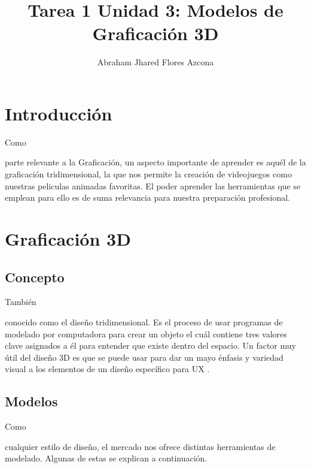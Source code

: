 \documentclass[stu, 12pt, letterpaper, donotrepeattitle, floatsintext, natbib]{apa7}
\title{\Large Tarea 1 Unidad 3: Modelos de Graficación 3D}
\author{Abraham Jhared Flores Azcona} %
\affiliation{Instituto Tecnológico de Tijuana}
\begin{document}
    \maketitle

    \renewcommand\contentsname{Contenido}
    \tableofcontents

    \newpage
    \section*{Introducción}
    Como \begin{justifying}
    parte relevante a la Graficación, un aspecto importante de aprender es aquél de la graficación tridimensional, la que nos permite la creación
    de videojuegos como nuestras peliculas animadas favoritas. El poder aprender las herramientas que se emplean para ello es de suma relevancia para nuestra preparación profesional.\par  
    \end{justifying}
    \vspace{\baselineskip}
    \section{Graficación 3D}
    \subsection{Concepto}
    También \begin{justifying}
        conocido como el diseño tridimensional. Es el proceso de usar programas de modelado por computadora para crear un objeto el cuál contiene tres valores clave
        asignados a él para entender que existe dentro del espacio. Un factor muy útil del diseño 3D es que
        se puede usar para dar un mayo énfasis y variedad visual a los elementos de un diseño específico para UX \citep{silveira-2021}.
        \par
    \end{justifying}
    \vspace{\baselineskip}
    \subsection{Modelos}
    Como \begin{justifying}
        cualquier estilo de diseño, el mercado nos ofrece distintas herramientas de modelado. Algunas de estas se explican a continuación.
    \end{justifying}
\end{document}
